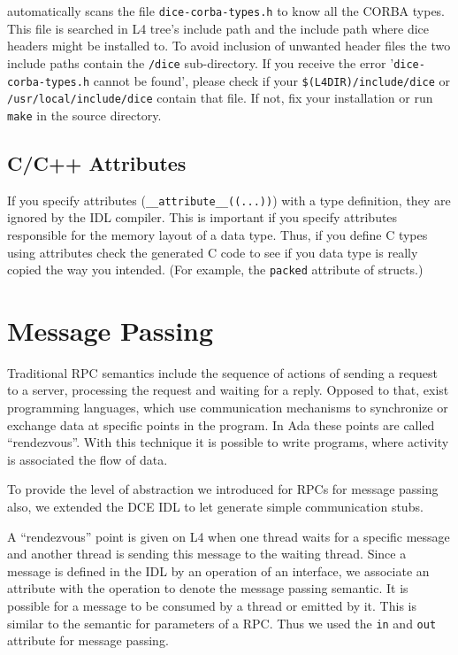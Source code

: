 \dice{} automatically scans the file \verb|dice-corba-types.h| to know all the
CORBA types. This file is searched in L4 tree's include path and the include
path where dice headers might be installed to. To avoid inclusion of unwanted
header files the two include paths contain the \verb|/dice| sub-directory.  If
you receive the error '\verb|dice-corba-types.h| cannot be found', please
check if your \verb|$(L4DIR)/include/dice| or \verb|/usr/local/include/dice|
contain that file. If not, fix your installation or run \verb|make| in the
\dice{} source directory.

\subsection{C/C++ Attributes}

If you specify attributes (\verb|__attribute__((...))|) with a type
definition, they are ignored by the IDL compiler. This is important if you
specify attributes responsible for the memory layout of a data type. Thus, if
you define C types using attributes check the generated C code to see if you
data type is really copied the way you intended. (For example, the
\verb|packed| attribute of structs.)

\section{Message Passing}
\label{sec:message-passing}

Traditional RPC semantics include the sequence of actions of sending a request
to a server, processing the request and waiting for a reply.  Opposed to that,
exist programming languages, which use communication mechanisms to synchronize
or exchange data at specific points in the program. In Ada these points are
called ``rendezvous''. With this technique it is possible to write programs,
where activity is associated the flow of data.

To provide the level of abstraction we introduced for RPCs for message passing
also, we extended the DCE IDL to let \dice{} generate simple communication
stubs.

A ``rendezvous'' point is given on L4 when one thread waits for a specific
message and another thread is sending this message to the waiting thread.
Since a message is defined in the IDL by an operation of an interface, we
associate an attribute with the operation to denote the message passing
semantic. It is possible for a message to be consumed by a thread or emitted
by it. This is similar to the semantic for parameters of a RPC. Thus we used
the \verb|in| and \verb|out| attribute for message passing.

